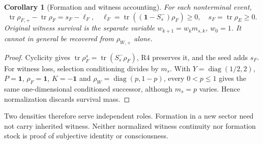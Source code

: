 \documentclass[11pt,letterpaper]{article}
\newcommand{\tr}{\operatorname{tr}}
\newcommand{\diag}{\operatorname{diag}}
\newcommand{\Id}{\mathbf 1}
\newtheorem{corollary}[theorem]{Corollary}
\theoremstyle{definition}
\numberwithin{equation}{section}
\begin{document}
\begin{corollary}[Formation and witness accounting]\label{accounting}
For each nonterminal event,
\begin{equation}
\tr\rho_{F,+}-\tr\rho_F=s_F-\ell_F,\quad
\ell_F=\tr((\Id-S_s^-)\rho_F)\geq0,\quad s_F=\tr\rho_E\geq0.
\end{equation}
Original witness survival is the separate variable $w_{k+1}=w_km_{s,k}$, $w_0=1$. It cannot in general be recovered from $\rho_{W,+}$ alone.
\end{corollary}
\begin{proof}
Cyclicity gives $\tr\rho_F^s=\tr(S_s^-\rho_F)$, R4 preserves it, and the seed adds $s_F$. For witness loss, selection conditioning divides by $m_s$. With $Y=\diag(1/2,2)$, $P=\Id$, $\rho_F=\Id$, $K=-\Id$ and $\rho_W=\diag(p,1-p)$, every $0<p\leq1$ gives the same one-dimensional conditioned successor, although $m_s=p$ varies. Hence normalization discards survival mass.
\end{proof}
Two densities therefore serve independent roles. Formation in a new sector need not carry inherited witness. Neither normalized witness continuity nor formation stock is proof of subjective identity or consciousness.
\end{document}

